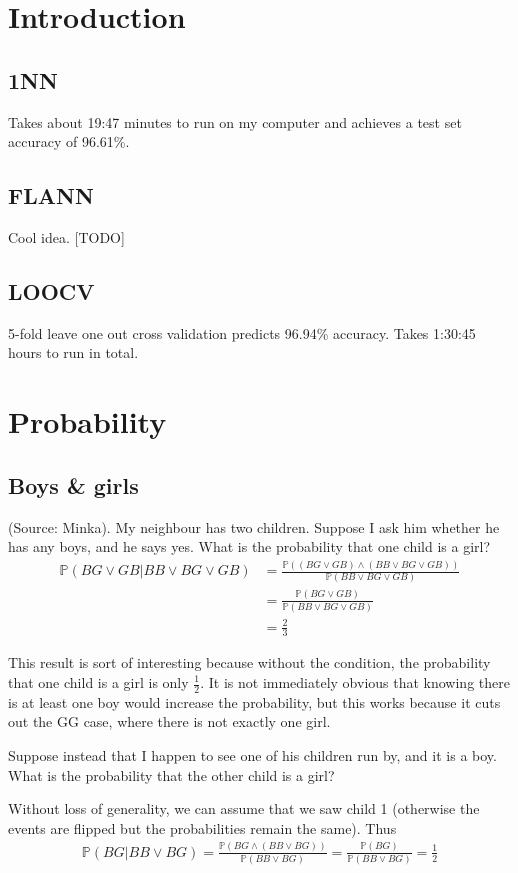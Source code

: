 \documentclass{article}
\begin{document}
\section{Introduction}
\subsection{1NN}
Takes about 19:47 minutes to run on my computer and achieves a test set accuracy of 96.61\%.
\subsection{FLANN}
Cool idea. [TODO]
\subsection{LOOCV}
5-fold leave one out cross validation predicts 96.94\% accuracy. Takes 1:30:45 hours to run in total.
\section{Probability}
\subsection{Boys \& girls}
(Source: Minka). My neighbour has two children. Suppose I ask him whether he has any boys, and he says yes. What is the probability that one child is a girl?
\begin{align*}
\mathbb{P}(BG \lor GB | BB \lor BG \lor GB) &= \frac{\mathbb{P}((BG \lor GB) \land (BB \lor BG \lor GB))}{\mathbb{P}(BB \lor BG \lor GB)}\\
&= \frac{\mathbb{P}(BG \lor GB)}{\mathbb{P}(BB \lor BG \lor GB)}\\
&= \frac{2}{3}
\end{align*}

This result is sort of interesting because without the condition, the probability that one child is a girl is only $\frac{1}{2}$. It is not immediately obvious that knowing there is at least one boy would increase the probability, but this works because it cuts out the GG case, where there is not exactly one girl.

Suppose instead that I happen to see one of his children run by, and it is a boy. What is the probability that the other child is a girl?

Without loss of generality, we can assume that we saw child 1 (otherwise the events are flipped but the probabilities remain the same). Thus
\begin{gather*}
\mathbb{P}(BG | BB \lor BG) = \frac{\mathbb{P}(BG \land (BB \lor BG))}{\mathbb{P}(BB \lor BG)} = \frac{\mathbb{P}(BG)}{\mathbb{P}(BB \lor BG)} = \frac{1}{2}
\end{gather*}
\end{document}
